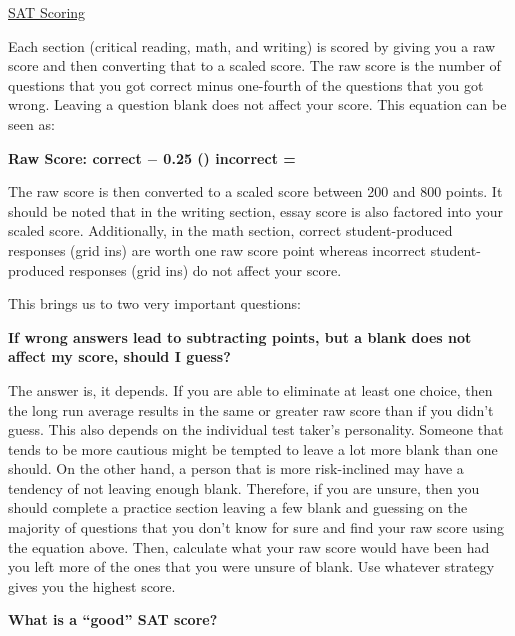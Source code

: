 \bigskip
\underline{SAT Scoring}

Each section (critical reading, math, and writing) is scored by giving you a raw score and then converting that to a scaled score. The raw score is the number of questions that you got correct minus one-fourth of the questions that you got wrong. Leaving a question blank does not affect your score. This equation can be seen as:

\bigskip
\textbf{Raw Score: \underline{\hspace{1in}} correct $\boldsymbol{-}$ 0.25 (\underline{\hspace{1in}}) incorrect = \underline{\hspace{1in}}}

\bigskip
The raw score is then converted to a scaled score between 200 and 800 points. It should be noted that in the writing section, essay score is also factored into your scaled score. Additionally, in the math section, correct student-produced responses (grid ins) are worth one raw score point whereas incorrect student-produced responses (grid ins) do not affect your score.

\bigskip
This brings us to two very important questions:

\bigskip
\begin{inparaenum}[\bfseries1. ]
\item \textbf{If wrong answers lead to subtracting points, but a blank does not affect my score, should I guess?}

\bigskip
The answer is, it depends. If you are able to eliminate at least one choice, then the long run average results in the same or greater raw score than if you didn't guess. This also depends on the individual test taker's personality. Someone that tends to be more cautious might be tempted to leave a lot more blank than one should. On the other hand, a person that is more risk-inclined may have a tendency of not leaving enough blank. Therefore, if you are unsure, then you should complete a practice section leaving a few blank and guessing on the majority of questions that you don't know for sure and find your raw score using the equation above. Then, calculate what your raw score would have been had you left more of the ones that you were unsure of blank. Use whatever strategy gives you the highest score.


\bigskip
\item \textbf{What is a ``good'' SAT score?}
\end{inparaenum}

